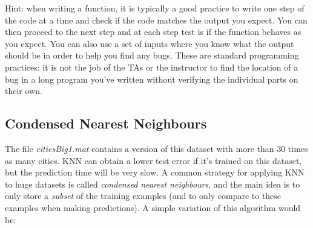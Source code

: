 \documentclass{article}
\begin{document}
Hint: when writing a function, it is typically a good practice to write one step of the code at a time and check if the code matches the output you expect. You can then proceed to the next step and at each step test is if the function behaves as you expect. You can also use a set of inputs where you know what the output should be in order to help you find any bugs. These are standard programming practices: it is not the job of the TAs or the instructor to find the location of a bug in a long program you've written without verifying the individual parts on their own.

\subsection{Condensed Nearest Neighbours}

The file \emph{citiesBig1.mat} contains a version of this dataset with more than 30 times as many cities. KNN can obtain a lower test error if it's trained on this dataset, but the prediction time will be very slow. A common strategy for applying KNN to huge datasets is called \emph{condensed nearest neighbours}, and the main idea is to only store a \emph{subset} of the training examples (and to only compare to these examples when making predictions). A simple variation of this algorithm would be:
\end{document}
